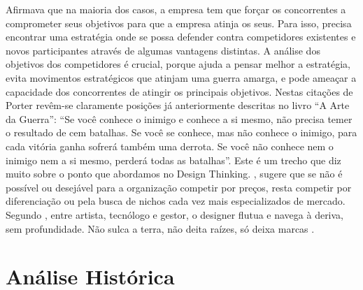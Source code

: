 \documentclass[twoside,twocolumn]{article}
\begin{document}
\newline \indent \citep{Porter1990} Afirmava que na maioria dos casos, a empresa tem que forçar os concorrentes a comprometer seus objetivos para que a empresa atinja os seus. Para isso, precisa encontrar uma estratégia onde se possa defender contra competidores existentes e novos participantes através de algumas vantagens distintas. A análise dos objetivos dos competidores é crucial, porque ajuda a pensar melhor a estratégia, evita movimentos estratégicos que atinjam uma guerra amarga, e pode ameaçar a capacidade dos concorrentes de atingir os principais objetivos. 
\newline \indent Nestas citações de Porter revêm-se claramente posições já anteriormente descritas no livro “A Arte da Guerra”: “Se você conhece o inimigo e conhece a si mesmo, não precisa temer o resultado de cem batalhas. Se você se conhece, mas não conhece o inimigo, para cada vitória ganha sofrerá também uma derrota. Se você não conhece nem o inimigo nem a si mesmo, perderá todas as batalhas”.\citep{Tzu1772} Este é um trecho que diz muito sobre o ponto que abordamos no Design Thinking.
\newline \indent \citep{Porter1990}, sugere que se não é possível ou desejável para a organização competir por preços, resta competir por diferenciação ou pela busca de nichos cada vez mais especializados de mercado.
\newline \indent Segundo \citep{Niemeyer2000}, entre artista, tecnólogo e gestor, o designer flutua e navega à deriva, sem profundidade. Não sulca a terra, não deita raízes, só deixa marcas .


\section{Análise Histórica} 
\end{document}
